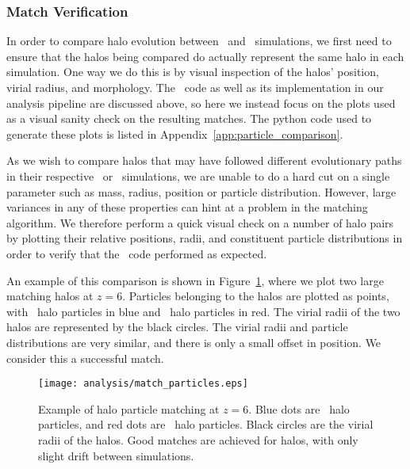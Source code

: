 \subsubsection{Match Verification}
\label{subsubsec:analysis--halo_comparison--match_verification}


In order to compare halo evolution between \lpt\ and \za\ simulations, we first need to ensure that the halos being compared do actually represent the same halo in each simulation.  One way we do this is by visual inspection of the halos' position, virial radius, and morphology.  The \crossmatch\ code as well as its implementation in our analysis pipeline are discussed above, so here we instead focus on the plots used as a visual sanity check on the resulting matches.  The python code used to generate these plots is listed in Appendix~\ref{app:particle_comparison}.

As we wish to compare halos that may have followed different evolutionary paths in their respective \lpt\ or \za\ simulations, we are unable to do a hard cut on a single parameter such as mass, radius, position or particle distribution.  However, large variances in any of these properties can hint at a problem in the matching algorithm.  We therefore perform a quick visual check on a number of halo pairs by plotting their relative positions, radii, and constituent particle distributions in order to verify that the \crossmatch\ code performed as expected.

An example of this comparison is shown in Figure~\ref{fig:match_verification}, where we plot two large matching halos at $z = 6$.  Particles belonging to the halos are plotted as points, with \lpt\ halo particles in blue and \za\ halo particles in red.  The virial radii of the two halos are represented by the black circles.  The virial radii and particle distributions are very similar, and there is only a small offset in position.  We consider this a successful match.

\begin{figure}[t]
	\centering
	\texttt{[image: analysis/match\_particles.eps]}
	\caption[Example of halo particle matching at $z = 6$.]{\footnotesize Example of halo particle matching at $z = 6$.  Blue dots are \lpt\ halo particles, and red dots are \za\ halo particles.  Black circles are the virial radii of the halos.  Good matches are achieved for halos, with only slight drift between simulations.}
	\label{fig:match_verification}
\end{figure}



